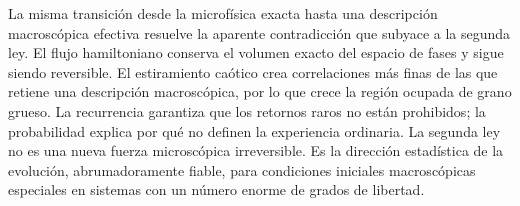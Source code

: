 La misma transición desde la microfísica exacta hasta una descripción macroscópica efectiva resuelve la aparente contradicción que subyace a la segunda ley. El flujo hamiltoniano conserva el volumen exacto del espacio de fases y sigue siendo reversible. El estiramiento caótico crea correlaciones más finas de las que retiene una descripción macroscópica, por lo que crece la región ocupada de grano grueso. La recurrencia garantiza que los retornos raros no están prohibidos; la probabilidad explica por qué no definen la experiencia ordinaria. La segunda ley no es una nueva fuerza microscópica irreversible. Es la dirección estadística de la evolución, abrumadoramente fiable, para condiciones iniciales macroscópicas especiales en sistemas con un número enorme de grados de libertad.